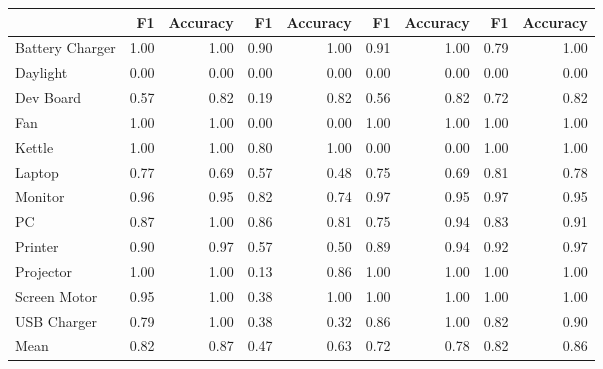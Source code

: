 \begin{tabular}{lrrrrrrrr}
\toprule
{} &    F1 &  Accuracy &    F1 &  Accuracy &    F1 &  Accuracy &    F1 &  Accuracy \\
\midrule
Battery Charger &  1.00 &      1.00 &  0.90 &      1.00 &  0.91 &      1.00 &  0.79 &      1.00 \\
Daylight        &  0.00 &      0.00 &  0.00 &      0.00 &  0.00 &      0.00 &  0.00 &      0.00 \\
Dev Board       &  0.57 &      0.82 &  0.19 &      0.82 &  0.56 &      0.82 &  0.72 &      0.82 \\
Fan             &  1.00 &      1.00 &  0.00 &      0.00 &  1.00 &      1.00 &  1.00 &      1.00 \\
Kettle          &  1.00 &      1.00 &  0.80 &      1.00 &  0.00 &      0.00 &  1.00 &      1.00 \\
Laptop          &  0.77 &      0.69 &  0.57 &      0.48 &  0.75 &      0.69 &  0.81 &      0.78 \\
Monitor         &  0.96 &      0.95 &  0.82 &      0.74 &  0.97 &      0.95 &  0.97 &      0.95 \\
PC              &  0.87 &      1.00 &  0.86 &      0.81 &  0.75 &      0.94 &  0.83 &      0.91 \\
Printer         &  0.90 &      0.97 &  0.57 &      0.50 &  0.89 &      0.94 &  0.92 &      0.97 \\
Projector       &  1.00 &      1.00 &  0.13 &      0.86 &  1.00 &      1.00 &  1.00 &      1.00 \\
Screen Motor    &  0.95 &      1.00 &  0.38 &      1.00 &  1.00 &      1.00 &  1.00 &      1.00 \\
USB Charger     &  0.79 &      1.00 &  0.38 &      0.32 &  0.86 &      1.00 &  0.82 &      0.90 \\
Mean            &  0.82 &      0.87 &  0.47 &      0.63 &  0.72 &      0.78 &  0.82 &      0.86 \\
\bottomrule
\end{tabular}
